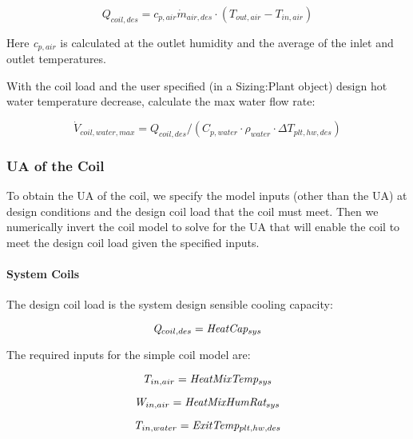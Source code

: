 \begin{equation}
Q_{coil,des} = c_{p,air} \dot m_{air,des} \cdot (T_{out,air} - T_{in,air})
\end{equation}

Here \emph{c\(_{p,air}\)} is calculated at the outlet humidity and the average of the inlet and outlet temperatures.

With the coil load and the user specified (in a Sizing:Plant object) design hot water temperature decrease, calculate the max water flow rate:

\begin{equation}
\dot V_{coil,water,max} = Q_{coil,des}/(C_{p,water} \cdot \rho_{water} \cdot \Delta T_{plt,hw,des})
\end{equation}

\subsubsection{UA of the Coil}\label{ua-of-the-coil}

To obtain the UA of the coil, we specify the model inputs (other than the UA) at design conditions and the design coil load that the coil must meet. Then we numerically invert the coil model to solve for the UA that will enable the coil to meet the design coil load given the specified inputs.

\paragraph{System Coils}\label{system-coils-1}

The design coil load is the system design sensible cooling capacity:

\begin{equation}
\emph{Q\(_{coil,des}\)} = \emph{HeatCap\(_{sys}\)}
\end{equation}

The required inputs for the simple coil model are:

\begin{equation}
\emph{T\(_{in,air}\)} = \emph{HeatMixTemp\(_{sys}\)}
\end{equation}

\begin{equation}
\emph{W\(_{in,air}\)} = \emph{HeatMixHumRat\(_{sys}\)}
\end{equation}

\begin{equation}
\emph{T\(_{in,water}\)} = \emph{ExitTemp\(_{plt,hw,des}\)}
\end{equation}

